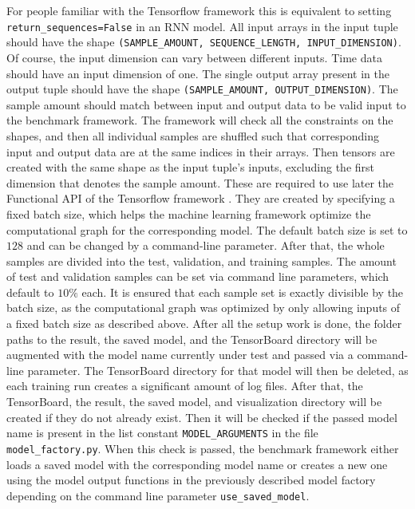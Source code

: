 \documentclass[draft,final]{vutinfth} %
\begin{document}
    For people familiar with the Tensorflow framework \cite{Tensorflow} this is equivalent to setting \texttt{return\_sequences=False} in an RNN model.
    All input arrays in the input tuple should have the shape \texttt{(SAMPLE\_AMOUNT, SEQUENCE\_LENGTH, INPUT\_DIMENSION)}.
    Of course, the input dimension can vary between different inputs. Time data should have an input dimension of one.
    The single output array present in the output tuple should have the shape \texttt{(SAMPLE\_AMOUNT, OUTPUT\_DIMENSION)}.
    The sample amount should match between input and output data to be valid input to the benchmark framework.
    The framework will check all the constraints on the shapes, and then all individual samples are shuffled such that corresponding input and output data are at the same indices in their arrays.
    Then tensors are created with the same shape as the input tuple's inputs, excluding the first dimension that denotes the sample amount.
    These are required to use later the Functional API of the Tensorflow framework \cite{Tensorflow}.
    They are created by specifying a fixed batch size, which helps the machine learning framework optimize the computational graph for the corresponding model.
    The default batch size is set to $128$ and can be changed by a command-line parameter.
    After that, the whole samples are divided into the test, validation, and training samples. The amount of test and validation samples can be set via command line parameters, which default to $10\%$ each.
    It is ensured that each sample set is exactly divisible by the batch size, as the computational graph was optimized by only allowing inputs of a fixed batch size as described above.
    After all the setup work is done, the folder paths to the result, the saved model, and the TensorBoard directory will be augmented with the model name currently under test and passed via a command-line parameter.
    The TensorBoard directory for that model will then be deleted, as each training run creates a significant amount of log files.
    After that, the TensorBoard, the result, the saved model, and visualization directory will be created if they do not already exist.
    Then it will be checked if the passed model name is present in the list constant \texttt{MODEL\_ARGUMENTS} in the file \texttt{model\_factory.py}.
    When this check is passed, the benchmark framework either loads a saved model with the corresponding model name or creates a new one using the model output functions in the previously described model factory depending on the command line parameter \texttt{use\_saved\_model}.
\end{document}
